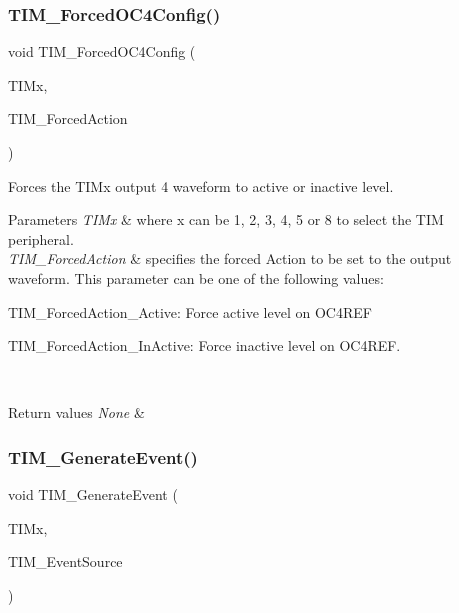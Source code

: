 \subsubsection{\texorpdfstring{TIM\_ForcedOC4Config()}{TIM\_ForcedOC4Config()}}
{\footnotesize\ttfamily void T\+I\+M\+\_\+\+Forced\+O\+C4\+Config (\begin{DoxyParamCaption}\item[{\mbox{\hyperlink{struct_t_i_m___type_def}{T\+I\+M\+\_\+\+Type\+Def}} $\ast$}]{T\+I\+Mx,  }\item[{uint16\+\_\+t}]{T\+I\+M\+\_\+\+Forced\+Action }\end{DoxyParamCaption})}



Forces the T\+I\+Mx output 4 waveform to active or inactive level. 


\begin{DoxyParams}{Parameters}
{\em T\+I\+Mx} & where x can be 1, 2, 3, 4, 5 or 8 to select the T\+IM peripheral. \\
\hline
{\em T\+I\+M\+\_\+\+Forced\+Action} & specifies the forced Action to be set to the output waveform. This parameter can be one of the following values\+: \begin{DoxyItemize}
\item T\+I\+M\+\_\+\+Forced\+Action\+\_\+\+Active\+: Force active level on O\+C4\+R\+EF \item T\+I\+M\+\_\+\+Forced\+Action\+\_\+\+In\+Active\+: Force inactive level on O\+C4\+R\+EF. \end{DoxyItemize}
\\
\hline
\end{DoxyParams}

\begin{DoxyRetVals}{Return values}
{\em None} & \\
\hline
\end{DoxyRetVals}
\mbox{\label{group___t_i_m___private___functions_ga38bd4ffda920dd4f7655a0a2c6100a6e}} 
\subsubsection{\texorpdfstring{TIM\_GenerateEvent()}{TIM\_GenerateEvent()}}
{\footnotesize\ttfamily void T\+I\+M\+\_\+\+Generate\+Event (\begin{DoxyParamCaption}\item[{\mbox{\hyperlink{struct_t_i_m___type_def}{T\+I\+M\+\_\+\+Type\+Def}} $\ast$}]{T\+I\+Mx,  }\item[{uint16\+\_\+t}]{T\+I\+M\+\_\+\+Event\+Source }\end{DoxyParamCaption})}



